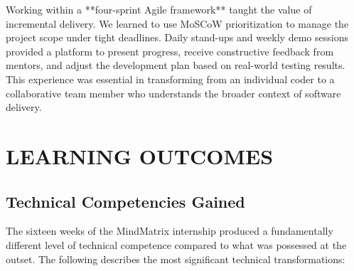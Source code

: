 \documentclass[12pt,a4paper]{report}
\begin{document}
\vspace{0.4cm}

Working within a **four-sprint Agile framework** taught the value of incremental delivery. We learned to use MoSCoW prioritization to manage the project scope under tight deadlines. Daily stand-ups and weekly demo sessions provided a platform to present progress, receive constructive feedback from mentors, and adjust the development plan based on real-world testing results. This experience was essential in transforming from an individual coder to a collaborative team member who understands the broader context of software delivery.

\newpage

\chapter{LEARNING OUTCOMES}

\section{Technical Competencies Gained}

The sixteen weeks of the MindMatrix internship produced a fundamentally different level of technical competence compared to what was possessed at the outset. The following describes the most significant technical transformations:
\end{document}
